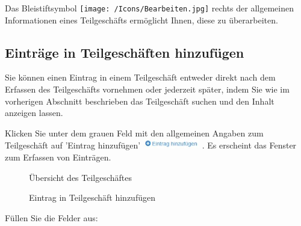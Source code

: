 Das Bleistiftsymbol \texttt{[image: /Icons/Bearbeiten.jpg]}  rechts der allgemeinen Informationen eines Teilgeschäfts ermöglicht Ihnen, diese zu überarbeiten.

\subsection{Einträge in Teilgeschäften hinzufügen}

Sie können einen Eintrag in einem Teilgeschäft entweder direkt nach dem Erfassen des Teilgeschäfts vornehmen oder jederzeit später, indem Sie wie im vorherigen Abschnitt beschrieben das Teilgeschäft suchen und den Inhalt anzeigen lassen.

Klicken Sie unter dem grauen Feld mit den allgemeinen Angaben zum Teilgeschäft auf 'Eintrag hinzufügen' \includegraphics[height=12pt]{../chapters/06_Geschaefte/pictures/6-4_TeilgeschaefteEintragHinzufuegen.jpg} . Es erscheint das Fenster zum Erfassen von Einträgen.

\begin{figure}[H]
\caption{Übersicht des Teilgeschäftes}
\end{figure}

\begin{figure}[H]
\caption{Eintrag in Teilgeschäft hinzufügen}
\end{figure}

Füllen Sie die Felder aus:


